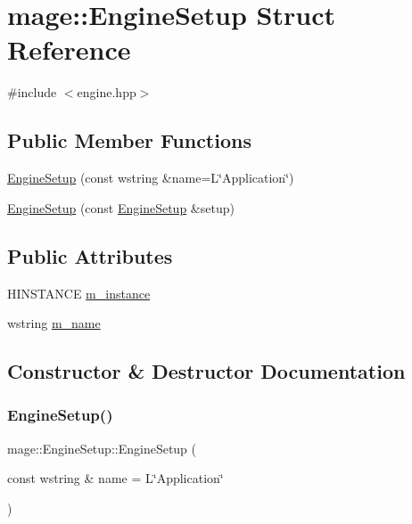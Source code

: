 \hypertarget{structmage_1_1_engine_setup}{}\section{mage\+:\+:Engine\+Setup Struct Reference}
\label{structmage_1_1_engine_setup}


{\ttfamily \#include $<$engine.\+hpp$>$}

\subsection*{Public Member Functions}
\begin{DoxyCompactItemize}
\item 
\hyperlink{structmage_1_1_engine_setup_a75ee36366d3035c9600e1dbe98973aa4}{Engine\+Setup} (const wstring \&name=L\char`\"{}Application\char`\"{})
\item 
\hyperlink{structmage_1_1_engine_setup_a2399c7966ed02ce9e9ab951b7483aac1}{Engine\+Setup} (const \hyperlink{structmage_1_1_engine_setup}{Engine\+Setup} \&setup)
\end{DoxyCompactItemize}
\subsection*{Public Attributes}
\begin{DoxyCompactItemize}
\item 
H\+I\+N\+S\+T\+A\+N\+CE \hyperlink{structmage_1_1_engine_setup_a13e9577c9762cccf127b51c1188d9477}{m\+\_\+instance}
\item 
wstring \hyperlink{structmage_1_1_engine_setup_a3866920e44c0752a89265f9f0c5c5d05}{m\+\_\+name}
\end{DoxyCompactItemize}


\subsection{Constructor \& Destructor Documentation}
\hypertarget{structmage_1_1_engine_setup_a75ee36366d3035c9600e1dbe98973aa4}{}\label{structmage_1_1_engine_setup_a75ee36366d3035c9600e1dbe98973aa4} 
\subsubsection{\texorpdfstring{Engine\+Setup()}{EngineSetup()}\hspace{0.1cm}{\footnotesize\ttfamily [1/2]}}
{\footnotesize\ttfamily mage\+::\+Engine\+Setup\+::\+Engine\+Setup (\begin{DoxyParamCaption}\item[{const wstring \&}]{name = {\ttfamily L\char`\"{}Application\char`\"{}} }\end{DoxyParamCaption})}

